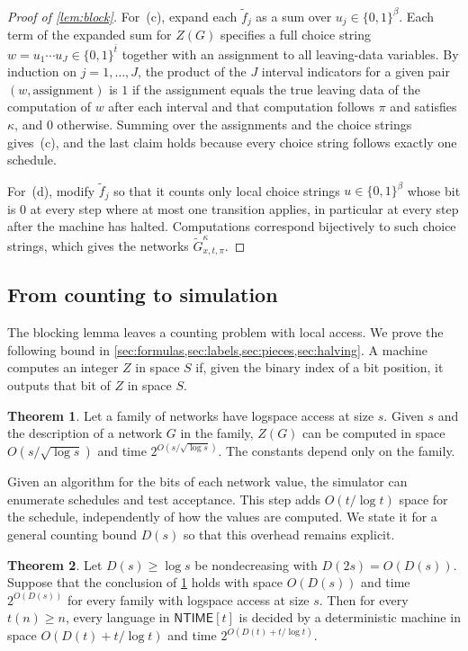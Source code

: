 \documentclass[11pt]{article}
\theoremstyle{definition}
\newtheorem{theorem}{Theorem}[section]
\theoremstyle{definition}
\theoremstyle{remark}
\newcommand{\NTIME}{\mathsf{NTIME}}
\begin{document}
\begin{proof}[Proof of \cref{lem:block}]
For~(c), expand each $\tilde f_j$ as a sum over $u_j\in\{0,1\}^\beta$. Each term of the expanded sum for $Z(G)$ specifies a full choice string $w=u_1\cdots u_J\in\{0,1\}^{\bar t}$ together with an assignment to all leaving-data variables. By induction on $j=1,\dots,J$, the product of the $J$ interval indicators for a given pair $(w,\text{assignment})$ is $1$ if the assignment equals the true leaving data of the computation of $w$ after each interval and that computation follows $\pi$ and satisfies $\kappa$, and $0$ otherwise. Summing over the assignments and the choice strings gives~(c), and the last claim holds because every choice string follows exactly one schedule.

For~(d), modify $\tilde f_j$ so that it counts only local choice strings $u\in\{0,1\}^\beta$ whose bit is $0$ at every step where at most one transition applies, in particular at every step after the machine has halted. Computations correspond bijectively to such choice strings, which gives the networks $\tilde G^\kappa_{x,t,\pi}$.
\end{proof}

\subsection{From counting to simulation}

The blocking lemma leaves a counting problem with local access. We prove the following bound in \cref{sec:formulas,sec:labels,sec:pieces,sec:halving}. A machine computes an integer $Z$ in space $S$ if, given the binary index of a bit position, it outputs that bit of $Z$ in space $S$.

\begin{theorem}\label{thm:counting}
Let a family of networks have logspace access at size $s$. Given $s$ and the description of a network $G$ in the family, $Z(G)$ can be computed in space $O(s/\sqrt{\log s})$ and time $2^{O(s/\sqrt{\log s})}$. The constants depend only on the family.
\end{theorem}

Given an algorithm for the bits of each network value, the simulator can enumerate schedules and test acceptance. This step adds $O(t/\log t)$ space for the schedule, independently of how the values are computed. We state it for a general counting bound $D(s)$ so that this overhead remains explicit.

\begin{theorem}\label{thm:transfer}
Let $D(s)\ge\log s$ be nondecreasing with $D(2s)=O(D(s))$. Suppose that the conclusion of \cref{thm:counting} holds with space $O(D(s))$ and time $2^{O(D(s))}$ for every family with logspace access at size $s$. Then for every $t(n)\ge n$, every language in $\NTIME[t]$ is decided by a deterministic machine in space $O(D(t)+t/\log t)$ and time $2^{O(D(t)+t/\log t)}$.
\end{theorem}
\end{document}
